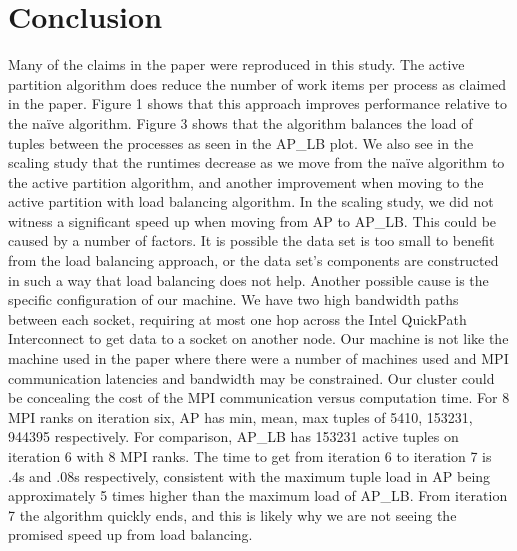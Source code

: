 \documentclass[11pt]{elsarticle}
\begin{document}
\section{Conclusion}
   Many of the claims in the paper were reproduced in this study. The active partition algorithm does reduce the number of work items per process as claimed in the paper. Figure 1 shows that this approach improves performance relative to the na{\"i}ve algorithm. Figure 3 shows that the algorithm balances the load of tuples between the processes as seen in the AP\_LB plot. We also see in the scaling study that the runtimes decrease as we move from the na{\"i}ve algorithm to the active partition algorithm, and another improvement when moving to the active partition with load balancing algorithm.
   In the scaling study, we did not witness a significant speed up when moving from AP to AP\_LB. This could be caused by a number of factors. It is possible the data set is too small to benefit from the load balancing approach, or the data set's components are constructed in such a way that load balancing does not help. Another possible cause is the specific configuration of our machine. We have two high bandwidth paths between each socket, requiring at most one hop across the Intel QuickPath Interconnect to get data to a socket on another node. Our machine is not like the machine used in the paper where there were a number of machines used and MPI communication latencies and bandwidth may be constrained. Our cluster could be concealing the cost of the MPI communication versus computation time. For 8 MPI ranks on iteration six, AP has min, mean, max tuples of 5410, 153231, 944395 respectively. For comparison, AP\_LB has 153231 active tuples on iteration 6 with 8 MPI ranks. The time to get from iteration 6 to iteration 7 is .4s and .08s respectively, consistent with the maximum tuple load in AP being approximately 5 times higher than the maximum load of AP\_LB. From iteration 7 the algorithm quickly ends, and this is likely why we are not seeing the promised speed up from load balancing.



\end{document}
